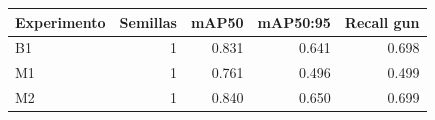 \begin{tabular}{lrrrr}
\hline
Experimento & Semillas & mAP50 & mAP50:95 & Recall gun \\
\hline
B1 & 1 & 0.831 & 0.641 & 0.698 \\
M1 & 1 & 0.761 & 0.496 & 0.499 \\
M2 & 1 & 0.840 & 0.650 & 0.699 \\
\hline
\end{tabular}
